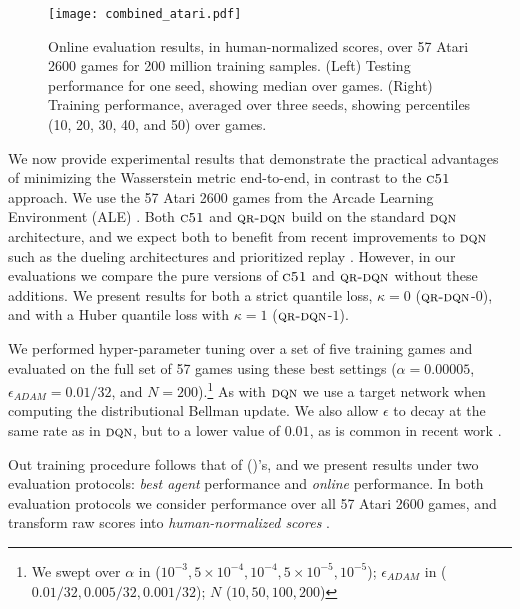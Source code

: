 \documentclass[letterpaper]{article}
\def \cfo {\textsc{c51}}
\def \dqn {\textsc{dqn}}
\def \qrdqn {\textsc{qr-dqn}}
\newcommand{\citet}[1]{\citeauthor{#1} (\citeyear{#1})}
\begin{document}
\begin{figure*}[ht]
\begin{center}
\texttt{[image: combined\_atari.pdf]}
\end{center}
\caption{Online evaluation results, in human-normalized scores, over 57 Atari 2600 games for 200 million training samples. (Left) Testing performance for one seed, showing median over games. (Right) Training performance, averaged over three seeds, showing percentiles (10, 20, 30, 40, and 50) over games.\label{fig:wdqn_test}}
\end{figure*}

We now provide experimental results that demonstrate the practical advantages of minimizing the Wasserstein metric end-to-end, in contrast to the $\cfo$ approach. We use the 57 Atari 2600 games from the Arcade Learning Environment (ALE) \cite{bellemare13arcade}. Both $\cfo$ and $\qrdqn$ build on the standard $\dqn$ architecture, and we expect both to benefit from recent improvements to $\dqn$ such as the dueling architectures \cite{wang2016dueling} and prioritized replay \cite{schaul16prioritized}. However, in our evaluations we compare the pure versions of $\cfo$ and $\qrdqn$ without these additions. We present results for both a strict quantile loss, $\kappa = 0$ ($\qrdqn$-$0$), and with a Huber quantile loss with $\kappa=1$ ($\qrdqn$-$1$). 

We performed hyper-parameter tuning over a set of five training games and evaluated on the full set of 57 games using these best settings ($\alpha = 0.00005$, $\epsilon_{ADAM} = 0.01/32$, and $N = 200$).\footnote{We swept over $\alpha$ in ($10^{-3}, 5\times 10^{-4}, 10^{-4}, 5 \times 10^{-5}, 10^{-5}$); $\epsilon_{ADAM}$ in ($0.01/32, 0.005/32, 0.001/32$); $N$ ($10, 50, 100, 200$)} As with $\dqn$ we use a target network when computing the distributional Bellman update. We also allow $\epsilon$ to decay at the same rate as in $\dqn$, but to a lower value of $0.01$, as is common in recent work \cite{c51,wang2016dueling,vanhasselt16deep}.

Out training procedure follows that of \citet{mnih15nature}'s, and we present results under two evaluation protocols: \textit{best agent} performance and \textit{online} performance. In both evaluation protocols we consider performance over all 57 Atari 2600 games, and transform raw scores into \textit{human-normalized scores} \cite{vanhasselt16deep}.
\end{document}
